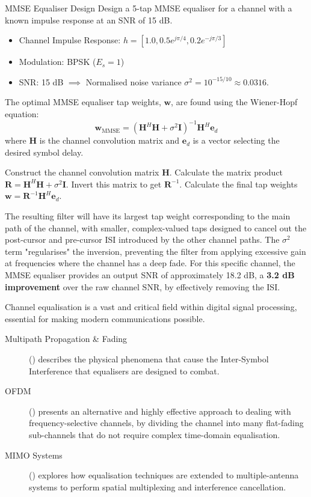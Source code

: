 \begin{workedexample}{MMSE Equaliser Design}
     Design a 5-tap MMSE equaliser for a channel with a known impulse response at an SNR of 15 dB.
    \begin{itemize}
        \item Channel Impulse Response: $h = [1.0, 0.5e^{j\pi/4}, 0.2e^{-j\pi/3}]$
        \item Modulation: BPSK ($E_s=1$)
        \item SNR: 15 dB $\implies$ Normalised noise variance $\sigma^2 = 10^{-15/10} \approx 0.0316$.
    \end{itemize}
    The optimal MMSE equaliser tap weights, $\mathbf{w}$, are found using the Wiener-Hopf equation:
    \[ \mathbf{w}_{\text{MMSE}} = (\mathbf{H}^H \mathbf{H} + \sigma^2 \mathbf{I})^{-1} \mathbf{H}^H \mathbf{e}_d \]
    where $\mathbf{H}$ is the channel convolution matrix and $\mathbf{e}_d$ is a vector selecting the desired symbol delay.
    \begin{derivationsteps}
        \step Construct the channel convolution matrix $\mathbf{H}$.
        \step Calculate the matrix product $\mathbf{R} = \mathbf{H}^H \mathbf{H} + \sigma^2 \mathbf{I}$.
        \step Invert this matrix to get $\mathbf{R}^{-1}$.
        \step Calculate the final tap weights $\mathbf{w} = \mathbf{R}^{-1} \mathbf{H}^H \mathbf{e}_d$.
    \end{derivationsteps}
     The resulting filter will have its largest tap weight corresponding to the main path of the channel, with smaller, complex-valued taps designed to cancel out the post-cursor and pre-cursor ISI introduced by the other channel paths. The $\sigma^2$ term "regularises" the inversion, preventing the filter from applying excessive gain at frequencies where the channel has a deep fade. For this specific channel, the MMSE equaliser provides an output SNR of approximately 18.2 dB, a \textbf{3.2 dB improvement} over the raw channel SNR, by effectively removing the ISI.
\end{workedexample}

\begin{importantbox}[title={Further Reading}]
    Channel equalisation is a vast and critical field within digital signal processing, essential for making modern communications possible.
    \begin{description}
        \item[Multipath Propagation \& Fading] () describes the physical phenomena that cause the Inter-Symbol Interference that equalisers are designed to combat.
        \item[OFDM] () presents an alternative and highly effective approach to dealing with frequency-selective channels, by dividing the channel into many flat-fading sub-channels that do not require complex time-domain equalisation.
        \item[MIMO Systems] () explores how equalisation techniques are extended to multiple-antenna systems to perform spatial multiplexing and interference cancellation.
    \end{description}
\end{importantbox}
